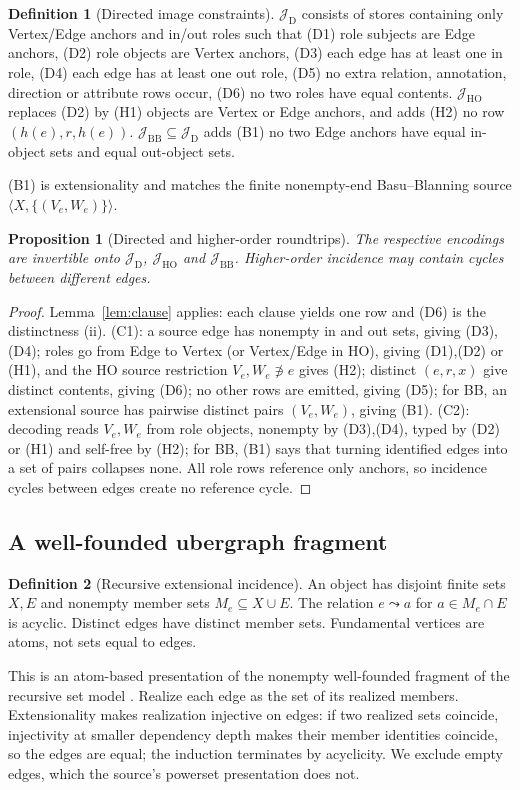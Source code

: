\documentclass[11pt]{article}
\theoremstyle{plain}
\newtheorem{proposition}[theorem]{Proposition}
\theoremstyle{definition}
\newtheorem{definition}{Definition}
\theoremstyle{remark}
\newcommand{\Img}[1]{\mathcal J_{\mathrm{#1}}}
\begin{document}
\begin{definition}[Directed image constraints]\label{def:dirimage}
$\Img{D}$ consists of stores containing only Vertex/Edge anchors and in/out roles such
that
\textup{(D1)} role subjects are Edge anchors,
\textup{(D2)} role objects are Vertex anchors,
\textup{(D3)} each edge has at least one in role,
\textup{(D4)} each edge has at least one out role,
\textup{(D5)} no extra relation, annotation, direction or attribute rows occur,
\textup{(D6)} no two roles have equal contents.
$\Img{HO}$ replaces (D2) by \textup{(H1)} objects are Vertex or Edge anchors, and adds
\textup{(H2)} no row $(h(e),r,h(e))$.
$\Img{BB}\subseteq\Img{D}$ adds \textup{(B1)} no two Edge anchors have equal in-object
sets and equal out-object sets.
\end{definition}
(B1) is extensionality and matches the finite nonempty-end Basu--Blanning source
$\langle X,\{(V_e,W_e)\}\rangle$.

\begin{proposition}[Directed and higher-order roundtrips]\label{prop:ho}
The respective encodings are invertible onto $\Img{D}$, $\Img{HO}$ and $\Img{BB}$.
Higher-order incidence may contain cycles between different edges.
\end{proposition}
\begin{proof}
Lemma~\ref{lem:clause} applies: each clause yields one row and (D6) is the distinctness
(ii). (C1): a source edge has nonempty in and out sets, giving (D3),(D4); roles go from
Edge to Vertex (or Vertex/Edge in HO), giving (D1),(D2) or (H1), and the HO source
restriction $V_e,W_e\not\ni e$ gives (H2); distinct $(e,r,x)$ give distinct contents, giving
(D6); no other rows are emitted, giving (D5); for BB, an extensional source has pairwise
distinct pairs $(V_e,W_e)$, giving (B1). (C2): decoding reads $V_e,W_e$ from role
objects, nonempty by (D3),(D4), typed by (D2) or (H1) and self-free by (H2); for BB,
(B1) says that turning identified edges into a set of pairs collapses none.
All role rows reference only anchors, so incidence cycles between edges create no
reference cycle.
\end{proof}

\subsection{A well-founded ubergraph fragment}
\begin{definition}[Recursive extensional incidence]
An object has disjoint finite sets $X,E$ and nonempty member sets
$M_e\subseteq X\cup E$. The relation $e\leadsto a$ for $a\in M_e\cap E$ is acyclic.
Distinct edges have distinct member sets. Fundamental vertices are atoms, not sets equal
to edges.
\end{definition}
This is an atom-based presentation of the nonempty well-founded fragment of the recursive
set model \cite{joslyn2017ubergraphs}. Realize each edge as the set of its realized
members. Extensionality makes realization injective on edges: if two realized sets
coincide, injectivity at smaller dependency depth makes their member identities
coincide, so the edges are equal; the induction terminates by acyclicity. We exclude
empty edges, which the source's powerset presentation does not.
\end{document}
